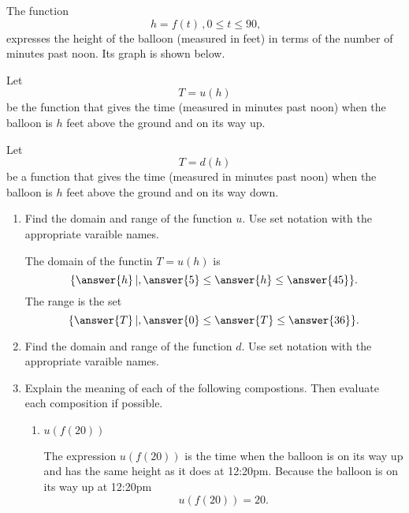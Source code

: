\documentclass{ximera}
\begin{document}
\begin{exploration} \label{E4:Quadratics}
The function 
\[
\   h=f(t) \, , 0\leq t \leq 90, 
\]
expresses the height of the balloon (measured in feet) in terms of the number of minutes past noon. Its graph is shown below. 

 
\begin{onlineOnly}
    \begin{center}
\end{center}
\end{onlineOnly}


Let 
\[
    T = u(h)
\]
be the function that gives the time (measured in minutes past noon) when the balloon is $h$ feet above the ground and on its way up.

Let 
\[
    T = d(h)
\]
be a function that gives the time (measured in minutes past noon) when the balloon is $h$ feet above the ground and on its way down.

\begin{enumerate}

\item Find the domain and range of the function $u$. Use set notation with the appropriate varaible names.

The domain of the functin $T=u(h)$ is
\[
    \{      \answer{h} \, | , \answer{5} \leq \answer{h} \leq \answer{45} \}.
\]
The range is the set
\[
   \{      \answer{T} \, | , \answer{0} \leq \answer{T} \leq \answer{36} \} .
\]

\item Find the domain and range of the function $d$. Use set notation with the appropriate varaible names.

\item Explain the meaning of each of the following compostions. Then evaluate each composition if possible.

\begin{enumerate}
\item $u(f(20))$

\begin{explanation}
The expression $u(f(20))$ is the time when the balloon is on its way up and has the same height as it does at 12:20pm. Because the balloon is on its way up at 12:20pm
\[
   u(f(20)) = 20.
\]
\end{explanation}


\end{enumerate}
\end{enumerate}
\end{exploration}
\end{document}
